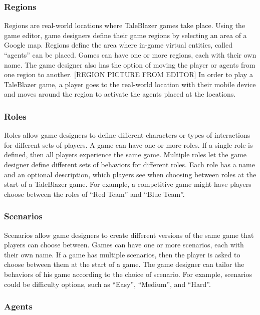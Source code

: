 \subsubsection{Regions}

Regions are real-world locations where TaleBlazer games take place. Using the game editor, game designers define their game regions by selecting an area of a Google map. Regions define the area where in-game virtual entities, called ``agents'' can be placed. Games can have one or more regions, each with their own name. The game designer also has the option of moving the player or agents from one region to another. [REGION PICTURE FROM EDITOR]  In order to play a TaleBlazer game, a player goes to the real-world location with their mobile device and moves around the region to activate the agents placed at the locations. 

\subsubsection{Roles}

Roles allow game designers to define different characters or types of interactions for different sets of players. A game can have one or more roles. If a single role is defined, then all players experience the same game. Multiple roles let the game designer define different sets of behaviors for different roles. Each role has a name and an optional description, which players see when choosing between roles at the start of a TaleBlazer game. For example, a competitive game might have players choose between the roles of ``Red Team'' and ``Blue Team''.

\subsubsection{Scenarios}

Scenarios allow game designers to create different versions of the same game that players can choose between. Games can have one or more scenarios, each with their own name. If a game has multiple scenarios, then the player is asked to choose between them at the start of a game. The game designer can tailor the behaviors of his game according to the choice of scenario. For example, scenarios could be difficulty options, such as ``Easy'', ``Medium'', and ``Hard''.

\subsubsection{Agents}

